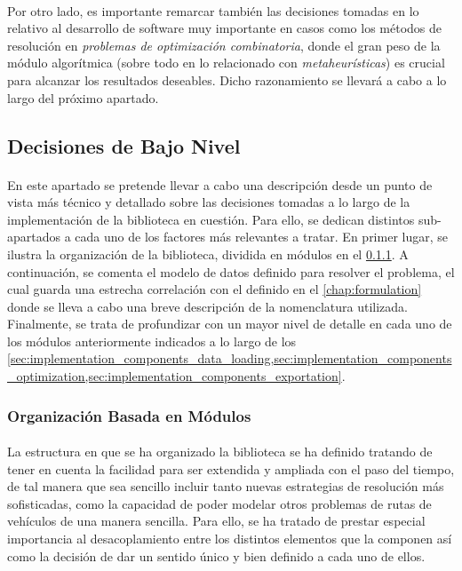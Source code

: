 \documentclass{subfiles}
\begin{document}
        \paragraph{}
        Por otro lado, es importante remarcar también las decisiones tomadas en lo relativo al desarrollo de software muy importante en casos como los métodos de resolución en \emph{problemas de optimización combinatoria}, donde el gran peso de la módulo algorítmica (sobre todo en lo relacionado con \emph{metaheurísticas}) es crucial para alcanzar los resultados deseables. Dicho razonamiento se llevará a cabo a lo largo del próximo apartado.

      \subsection{Decisiones de Bajo Nivel}
      \label{sec:implementation_low_level}

        \paragraph{}
        En este apartado se pretende llevar a cabo una descripción desde un punto de vista más técnico y detallado sobre las decisiones tomadas a lo largo de la implementación de la biblioteca en cuestión. Para ello, se dedican distintos sub-apartados a cada uno de los factores más relevantes a tratar. En primer lugar, se ilustra la organización de la biblioteca, dividida en módulos en el \cref{sec:implementation_components}. A continuación, se comenta el modelo de datos definido para resolver el problema, el cual guarda una estrecha correlación con el definido en el \cref{chap:formulation} donde se lleva a cabo una breve descripción de la nomenclatura utilizada. Finalmente, se trata de profundizar con un mayor nivel de detalle en cada uno de los módulos anteriormente indicados a lo largo de los \cref{sec:implementation_components_data_loading,sec:implementation_components_optimization,sec:implementation_components_exportation}.

        \subsubsection{Organización Basada en Módulos}
        \label{sec:implementation_components}

          \paragraph{}
          La estructura en que se ha organizado la biblioteca se ha definido tratando de tener en cuenta la facilidad para ser extendida y ampliada con el paso del tiempo, de tal manera que sea sencillo incluir tanto nuevas estrategias de resolución más sofisticadas, como la capacidad de poder modelar otros problemas de rutas de vehículos de una manera sencilla. Para ello, se ha tratado de prestar especial importancia al desacoplamiento entre los distintos elementos que la componen así como la decisión de dar un sentido único y bien definido a cada uno de ellos.
\end{document}
